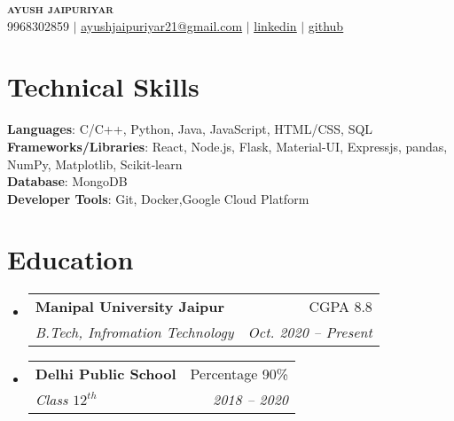 \documentclass[a4paper,11pt]{article}
\makeatletter
\newcommand{\resumeSubheading}[4]{
    \vspace{-2pt}\item
    \begin{tabular*}{0.97\textwidth}[t]{l@{\extracolsep{\fill}}r}
        \textbf{#1} & #2 \\
        \textit{\small#3} & \textit{\small #4} \\
    \end{tabular*}\vspace{-7pt}
}
\newcommand{\resumeSubHeadingListStart}{\begin{itemize}[leftmargin=0.15in, label={}]}
\newcommand{\resumeSubHeadingListEnd}{\end{itemize}}
\makeatother
\begin{document}

\begin{center}
    \textbf{\Huge \scshape ayush jaipuriyar} \\ \vspace{1pt}
    \small 9968302859 $|$ \href{mailto:ayushjaipuriyar21@gmail.com}{\underline{ayushjaipuriyar21@gmail.com}} $|$
    \href{https://linkedin.com/in/ayushjaipuriyar}{\underline{linkedin}} $|$
    \href{https://github.com/ayushjaipiuriyar}{\underline{github}}
\end{center}

%
\section{Technical Skills}
\begin{itemize}[leftmargin=0.15in, label={}]
    \small{\item{
                    \textbf{Languages}{: C/C++, Python, Java, JavaScript, HTML/CSS, SQL} \\
                    \textbf{Frameworks/Libraries}{: React, Node.js, Flask, Material-UI, Expressjs, pandas, NumPy, Matplotlib, Scikit‑learn} \\
                    \textbf{Database}{: MongoDB} \\
                    \textbf{Developer Tools}{: Git, Docker,Google Cloud Platform} \\
              }}
\end{itemize}

%

\section{Education}
\resumeSubHeadingListStart
\resumeSubheading
{Manipal University Jaipur}{CGPA 8.8}
{B.Tech, Infromation Technology}{Oct. 2020 -- Present}
\resumeSubheading
{Delhi Public School}{Percentage 90\%}
{Class $12^{th}$}{2018 -- 2020}
\resumeSubHeadingListEnd
\end{document}
